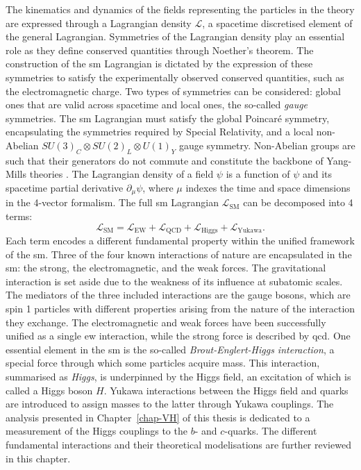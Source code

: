 The kinematics and dynamics of the fields representing the particles in the theory are expressed through a Lagrangian density $\mathcal{L}$, a spacetime discretised element of the general Lagrangian. Symmetries of the Lagrangian density play an essential role as they define conserved quantities through Noether's theorem. The construction of the \gls{sm} Lagrangian is dictated by the expression of these symmetries to satisfy the experimentally observed conserved quantities, such as the electromagnetic charge. Two types of symmetries can be considered: global ones that are valid across spacetime and local ones, the so-called \textit{gauge} symmetries. The \gls{sm} Lagrangian must satisfy the global Poincaré symmetry, encapsulating the symmetries required by Special Relativity, and a local non-Abelian $SU(3)_C \otimes SU(2)_L \otimes U(1)_Y$ gauge symmetry. Non-Abelian groups are such that their generators do not commute and constitute the backbone of Yang-Mills theories \cite{PhysRev.96.191}. The Lagrangian density of a field $\psi$ is a function of $\psi$ and its spacetime partial derivative $\partial_{\mu} \psi$, where $\mu$ indexes the time and space dimensions in the 4-vector formalism. The full \gls{sm} Lagrangian $\mathcal{L}_{\text{SM}}$ can be decomposed into 4 terms:
\begin{equation}\label{eq-SMGlobal}
    \mathcal{L}_{\text{SM}} = \mathcal{L}_{\text{EW}} + \mathcal{L}_{\text{QCD}} + \mathcal{L}_{\text{Higgs}} + \mathcal{L}_{\text{Yukawa}}.
\end{equation}
Each term encodes a different fundamental property within the unified framework of the \gls{sm}. Three of the four known interactions of nature are encapsulated in the \gls{sm}: the strong, the electromagnetic, and the weak forces. The gravitational interaction is set aside due to the weakness of its influence at subatomic scales. The mediators of the three included interactions are the gauge bosons, which are spin 1 particles with different properties arising from the nature of the interaction they exchange. The electromagnetic and weak forces have been successfully unified as a single \gls{ew} interaction, while the strong force is described by \gls{qcd}. One essential element in the \gls{sm} is the so-called \textit{Brout-Englert-Higgs interaction}, a special force through which some particles acquire mass. This interaction, summarised as \textit{Higgs}, is underpinned by the Higgs field, an excitation of which is called a Higgs boson $H$. Yukawa interactions between the Higgs field and quarks are introduced to assign masses to the latter through Yukawa couplings. The analysis presented in Chapter~\ref{chap-VH} of this thesis is dedicated to a measurement of the Higgs couplings to the $b$- and $c$-quarks. The different fundamental interactions and their theoretical modelisations are further reviewed in this chapter.

